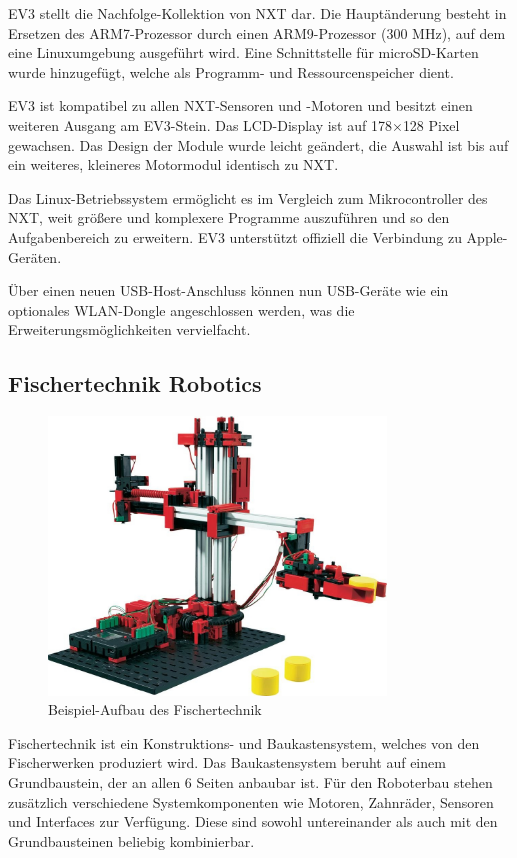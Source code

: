 EV3 stellt die Nachfolge-Kollektion von NXT dar. Die Hauptänderung besteht in Ersetzen des ARM7-Prozessor durch einen ARM9-Prozessor (300 MHz), auf dem eine Linuxumgebung ausgeführt wird. Eine Schnittstelle für microSD-Karten wurde hinzugefügt, welche als Programm- und Ressourcenspeicher dient.

EV3 ist kompatibel zu allen NXT-Sensoren und -Motoren und besitzt einen weiteren Ausgang am EV3-Stein. Das LCD-Display ist auf 178$\times$128 Pixel gewachsen. Das Design der Module wurde leicht geändert, die Auswahl ist bis auf ein weiteres, kleineres Motormodul identisch zu NXT.

Das Linux-Betriebssystem ermöglicht es im Vergleich zum Mikrocontroller des NXT, weit größere und komplexere Programme auszuführen und so den Aufgabenbereich zu erweitern. EV3 unterstützt offiziell die Verbindung zu Apple-Geräten.

Über einen neuen USB-Host-Anschluss können nun USB-Geräte wie ein optionales WLAN-Dongle angeschlossen werden, was die Erweiterungsmöglichkeiten vervielfacht.


\subsection{Fischertechnik Robotics}

\begin{figure}[h]
\centering
\includegraphics[width=0.8\textwidth]{Bilder/MatsAndMets/fischer}
\caption{Beispiel-Aufbau des Fischertechnik}
\label{fig:fischertechnik}
\end{figure}

Fischertechnik ist ein Konstruktions- und Baukastensystem, welches von den Fischerwerken produziert wird. Das Baukastensystem beruht auf einem Grundbaustein, der an allen 6 Seiten anbaubar ist. Für den Roboterbau stehen zusätzlich verschiedene Systemkomponenten wie Motoren, Zahnräder, Sensoren und Interfaces zur Verfügung. Diese sind sowohl untereinander als auch mit den Grundbausteinen beliebig kombinierbar.

